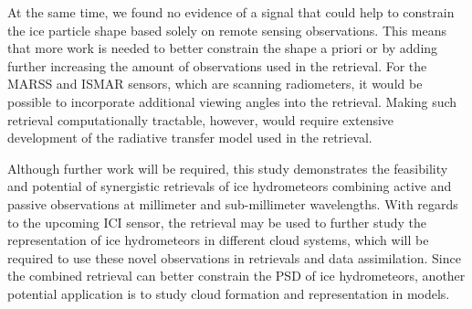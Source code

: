 \documentclass[journal abbreviation, manuscript]{copernicus}
\begin{document}
At the same time, we found no evidence of a signal that could help to constrain
the ice particle shape based solely on remote sensing observations. This means
that more work is needed to better constrain the shape a priori or by adding
further increasing the amount of observations used in the retrieval. For the
MARSS and ISMAR sensors, which are scanning radiometers, it would be possible to
incorporate additional viewing angles into the retrieval. Making such retrieval
computationally tractable, however, would require extensive development of the
radiative transfer model used in the retrieval.

Although further work will be required, this study demonstrates the feasibility
and potential of synergistic retrievals of ice hydrometeors combining active
and passive observations at millimeter and sub-millimeter wavelengths. With
regards to the upcoming ICI sensor, the retrieval may be used to further study
the representation of ice hydrometeors in different cloud systems, which will be
required to use these novel observations in retrievals and data assimilation.
Since the combined retrieval can better constrain the PSD of ice hydrometeors,
another potential application is to study cloud formation and representation in
models.






\dataavailability{} %



\appendix



\noappendix       %


\end{document}
